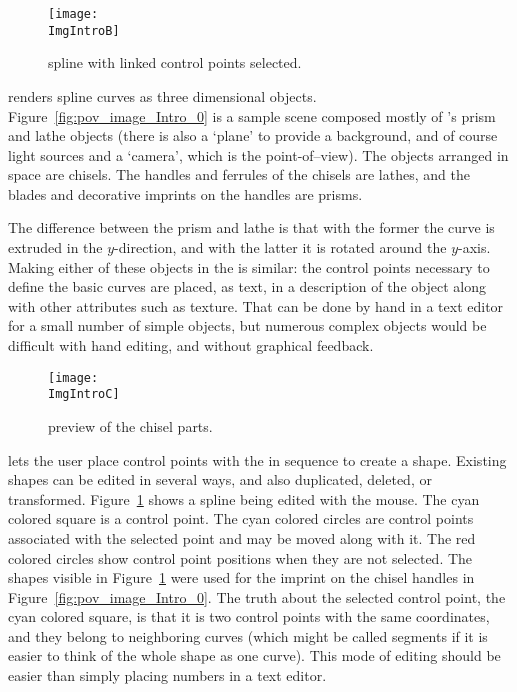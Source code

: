 \begin{figure}[htb]
\centering
\texttt{[image: \\ImgIntroB]}
\caption{\dtybeznu{} spline with linked control points selected.}
\label{fig:bezier_linked_control_points}
\end{figure}

\IXpov{} renders spline curves as three dimensional objects.
Figure~\ref{fig:pov_image_Intro_0} is a sample scene
composed mostly of \IXpov's prism and lathe objects
(there is also a `plane' to provide a background, and of course
light sources and a `camera', which is the point-of--view).
The objects arranged in space
are chisels. The handles and ferrules of the chisels are
\IXpov{} lathes, and the blades and decorative imprints
on the handles are prisms.

The difference between the prism and lathe is that
with the former the curve is extruded in the $y$-direction,
and with the latter it is rotated around the $y$-axis.
Making either of these objects in the \IXpov{} 
is similar: the control points necessary to define the
basic curves are placed, as text, in a description of
the object along with other attributes such as texture.
That can be done by hand in a text editor for a small
number of simple objects, but numerous complex objects
would be difficult with hand editing, and
without graphical feedback.

\begin{figure}[htb]
\centering
\texttt{[image: \\ImgIntroC]}
\caption{\IXpov{} preview of the chisel parts.}
\label{fig:chisel_edit_preview_1}
\end{figure}

\IXpkgu{} lets the user place control points with the
 in sequence to create a shape.
Existing shapes can be edited in several ways, and also
duplicated, deleted, or transformed.
Figure~\ref{fig:bezier_linked_control_points}
shows a \IXarg{\dtybezil} spline being edited with the mouse.
The cyan colored square is a  control
point. The cyan colored circles are control points
associated with the selected point and may be moved along with
it. The red colored circles show control point
positions when they are not selected. The shapes visible
in Figure~\ref{fig:bezier_linked_control_points} were
used for the imprint on the chisel handles in
Figure~\ref{fig:pov_image_Intro_0}. The truth about
the selected control point, the cyan colored square, is
that it is two control points with the same coordinates,
and they belong to neighboring curves (which might be
called segments if it is easier to think of the whole
shape as one curve). This mode of editing should be easier
than simply placing numbers in a text editor.

